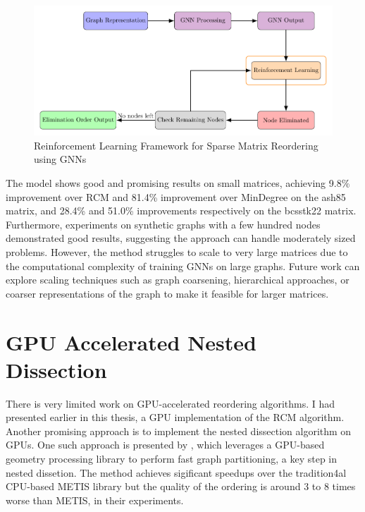 \begin{figure}[h]
    \centering
    \includegraphics[width=\textwidth]{fig/other/diagram.pdf}
    \caption{Reinforcement Learning Framework for Sparse Matrix Reordering using GNNs}
    \label{fig:rl_method}
\end{figure}

The model shows good and promising results on small matrices, achieving 9.8\% improvement over RCM and 81.4\% improvement over MinDegree on the ash85 matrix, and 28.4\% and 51.0\% improvements respectively on the bcsstk22 matrix. Furthermore, experiments on synthetic graphs with a few hundred nodes demonstrated good results, suggesting the approach can handle moderately sized problems. However, the method struggles to scale to very large matrices due to the computational complexity of training GNNs on large graphs. Future work can explore scaling techniques such as graph coarsening, hierarchical approaches, or coarser representations of the graph to make it feasible for larger matrices.

\section{GPU Accelerated Nested Dissection}

There is very limited work on GPU-accelerated reordering algorithms. I had presented earlier in this thesis, a GPU implementation of the RCM algorithm. Another promising approach is to implement the nested dissection algorithm on GPUs. One such approach is presented by \cite{yuan_fast_nodate}, which leverages a GPU-based geometry processing library to perform fast graph partitioning, a key step in nested dissetion. The method achieves sigificant speedups over the tradition4al CPU-based METIS library but the quality of the ordering is around 3 to 8 times worse than METIS, in their experiments.

